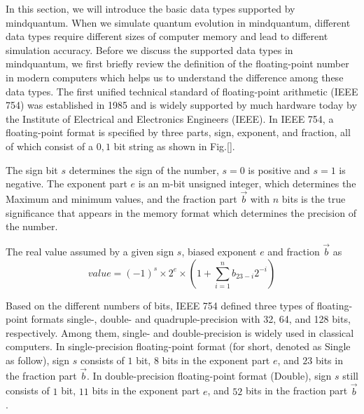 
In this section, we will introduce the basic data types supported by mindquantum. When we simulate quantum evolution in mindquantum, different data types require different sizes of computer memory and lead to different simulation accuracy.
Before we discuss the supported data types in mindquantum, we first briefly review the definition of the floating-point number in modern computers which helps us to understand the difference among these data types.
The first unified technical standard of floating-point arithmetic (IEEE 754) was established in 1985 and is widely supported by much hardware today by the Institute of Electrical and Electronics Engineers (IEEE).
In IEEE 754, a floating-point format is specified by three parts, sign, exponent, and fraction, all of which consist of a ${0,1}$ bit string as shown in Fig.\ref{}.

The sign bit $s$ determines the sign of the number, $s=0$ is positive and $s=1$ is negative. 
The exponent part $e$ is an m-bit unsigned integer, which determines the Maximum and minimum values, and the fraction part $\vec{b}$ with $n$ bits is the true significance that appears in the memory format which determines the precision of the number.

The real value assumed by a given sign $s$, biased exponent $e$ and fraction $\vec{b}$ as
\begin{equation}
    value = (-1)^{s}\times 2^{e}\times (1+\sum_{i=1}^nb_{23-i}2^{-i})
\end{equation}

Based on the different numbers of bits, IEEE 754 defined three types of floating-point formats single-, double- and quadruple-precision with 32, 64, and 128 bits, respectively.
Among them, single- and double-precision is widely used in classical computers.
In single-precision floating-point format (for short, denoted as Single as follow), sign $s$ consists of $1$ bit, $8$ bits in the exponent part $e$, and $23$ bits in the fraction part $\vec{b}$. 
In double-precision floating-point format (Double), sign $s$ still consists of $1$ bit, $11$ bits in the exponent part $e$, and $52$ bits in the fraction part $\vec{b}$.

